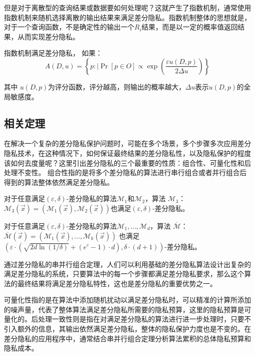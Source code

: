 但是对于离散型的查询结果或数据要如何处理呢？这就产生了指数机制，通常使用指数机制来随机选择离散的输出结果来满足差分隐私。指数机制整体的思想就是，对于一个查询函数，不是确定性的输出一个$R_{i}$结果，而是以一定的概率值返回结果，从而实现差分隐私。

\begin{theorem}[指数机制]\label{指数机制}
指数机制满足差分隐私， 如果：
$$
A(D,u)=\left\{p: \mid \operatorname{Pr}[p \in O] \propto \exp \left(\frac{\varepsilon u(D,p)}{2 \Delta u}\right)\right\}
$$
\end{theorem}
其中 $u(D,p)$为评分函数，评分越高，则输出的概率越大，$\Delta u$表示$u(D,p)$的全局敏感度。

\subsection{相关定理}

在解决一个复杂的差分隐私保护问题时，可能在多个场景，多个步骤多次应用差分隐私技术，在这种情况下，如何保证最终结果的差分隐私性，以及隐私保护的程度该如何去度量呢？这里引出差分隐私的三个最重要的性质：组合性、可量化性和后处理不变性。
组合性指的是将多个差分隐私的算法进行串行组合或者并行组合后得到的算法整体依然满足差分隐私。

\begin{theorem}\label{串行组合}
对于任意满足$(\varepsilon, \delta)$-差分隐私的算法$\mathcal{M}_{1}$和$\mathcal{M}_{2}$，算法 $\mathcal{M}_{3}$：$\mathcal{M}_{3}(\vec{x})=\left(\mathcal{M}_{1}(\vec{x}), \mathcal{M}_{2}(\vec{x})\right)$也满足$(\varepsilon, \delta)$-差分隐私。
\end{theorem}

\begin{theorem}\label{并行组合}
对于任意满足$(\varepsilon, \delta)$-差分隐私的算法$\mathcal{M}_{1}, \ldots, \mathcal{M}_{d}$，算法 $\overline{\mathcal{M}}$：$\overline{\mathcal{M}}(\vec{x})=\left(\mathcal{M}_{1}(\vec{x}), \ldots, \mathcal{M}_{k}(\vec{x})\right)$ 也满足$\left(\varepsilon \cdot\left(\sqrt{2 d \ln (1 / \delta)}+\left(e^{\varepsilon}-1\right) \cdot d\right), \delta \cdot(d+1)\right)$-差分隐私。
\end{theorem}

通过差分隐私的串并行组合定理，人们可以利用基础的差分隐私算法设计出复杂的满足差分隐私的系统，只要算法中的每一个步骤都满足差分隐私要求，那么这个算法的最终结果将满足差分隐私特性，这也是差分隐私的重要优势之一。 

可量化性指的是在算法中添加随机扰动以满足差分隐私时，可以精准的计算所添加的噪声量，代表了整体算法满足差分隐私所需要的隐私预算，这里的隐私预算是可量化的。后处理一致性则是指在对满足差分隐私的算法进行进一步处理时，只要不引入额外的信息，其输出依然满足差分隐私，整体的隐私保护力度也是不变的。在差分隐私的应用程序中，通常结合串并行组合定理分析算法累积的总体隐私预算和隐私成本。


